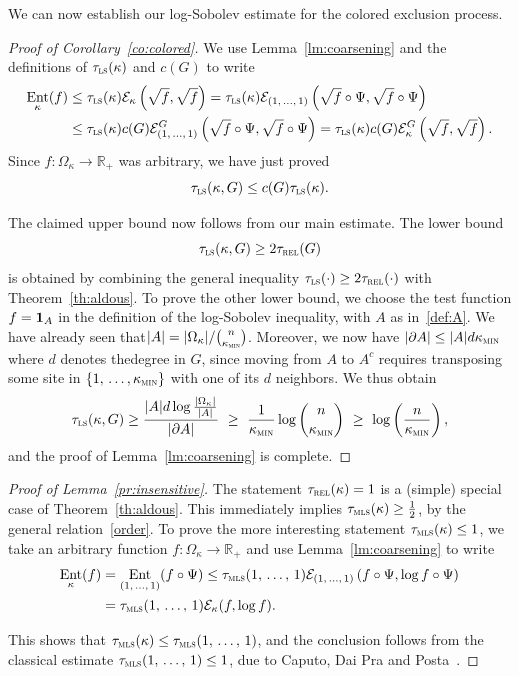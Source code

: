 \documentclass[AHL,Unicode,longabstracts,published]{cedram}
\newcommand{\R}{\mathbb{R}}
\newcommand{\cE}{\mathcal{E}}
\newcommand{\trel}{\tau_{\textsc{rel}}}
\newcommand{\tmls}{\tau_{\textsc{mls}}}
\newcommand{\tls}{\tau_{\textsc{ls}}}
\newcommand{\am}{{\kappa_{\textsc{min}}}}
\newcommand{\bfun}{\bf 1}
\DeclareMathOperator{\ent}{Ent}
\begin{document}
We can now establish our log-Sobolev estimate for the colored exclusion process.

\begin{proof}[Proof of Corollary~\ref{co:colored}]We use Lemma~\ref{lm:coarsening} and the definitions of $\tls(\kappa)$ and $c(G)$ to write
\begin{align*}
\ent_\kappa(f)
& \le \tls(\kappa)\cE_\kappa\left(\sqrt{f},\sqrt{f}\right)
= \tls(\kappa)\cE_{(1,\,\ldots,\,1)}\left(\sqrt{f}\circ\Psi,\sqrt{f}\circ\Psi\right)\\
& \le \tls(\kappa)c(G)\cE_{(1,\,\ldots,\,1)}^G\left(\sqrt{f}\circ\Psi,\sqrt{f}\circ\Psi\right)
= \tls(\kappa)c(G)\cE_{\kappa}^G\left(\sqrt{f},\sqrt{f}\right).
\end{align*}
Since $f\colon\Omega_\kappa\to\R_+$ was arbitrary, we have just proved
\[
\tls(\kappa,G) \le c(G)\tls(\kappa).
\]

The claimed upper bound now follows from our main estimate. The lower bound
\[
\tls(\kappa,G) \ge 2\trel(G)
\]
is obtained by combining the general inequality $\tls(\cdot)\ge 2\trel(\cdot)$ with Theorem~\ref{th:aldous}. To prove the other lower bound, we choose the test function $f={\bfun}_A$ in the definition of the log-Sobolev inequality, with $A$ as in~\eqref{def:A}. We have already seen that\linebreak$|A|=|\Omega_\kappa|/\binom{n}{\am}$. Moreover, we now have $|\partial A|\le |A|d\am$ where $d$ denotes the\linebreak degree in $G$, since moving from $A$ to $A^c$ requires transposing some site in $\{1,\,\ldots,\linebreak\am\}$ with one of its $d$ neighbors. We thus obtain
\[
\tls(\kappa,G) \ge \frac{|A|d\log\frac{|\Omega_\kappa|}{|A|}}{|\partial A|} \ \ge \ \frac{1}{\am}\log \binom{n}{\am} \ \ge \ \log\left({\frac n\am}\right),
\]
and the proof of Lemma~\ref{lm:coarsening} is complete.
\end{proof}


\begin{proof}[Proof of Lemma~\ref{pr:insensitive}]The statement $\trel(\kappa)=1$ is a (simple) special case of Theorem~\ref{th:aldous}. This immediately implies $\tmls(\kappa)\ge \frac 12$, by the general relation~\eqref{order}. To prove the more interesting statement $\tmls(\kappa)\le 1$, we take an arbitrary function $f\colon\Omega_\kappa\to\R_+$ and use Lemma~\ref{lm:coarsening} to write
\begin{align*}
\ent_\kappa(f)
& = \ent_{(1,\,\ldots,\,1)}(f\circ\Psi)\le \tmls(1,\,\ldots,\,1)\cE_{(1,\,\ldots,\,1)}\left(f\circ\Psi,\log f\circ\Psi\right)\\
& = \tmls(1,\,\ldots,\,1)\cE_{\kappa}(f,\log f).
\end{align*}

This shows that $\tmls(\kappa)\le\tmls(1,\,\ldots,\,1)$, and the conclusion follows from the classical estimate $\tmls(1,\,\ldots,\,1)\le 1$, due to Caputo, Dai Pra and Posta~\cite[Theorem~5.1]{MR2548501}.
\end{proof}



\end{document}
